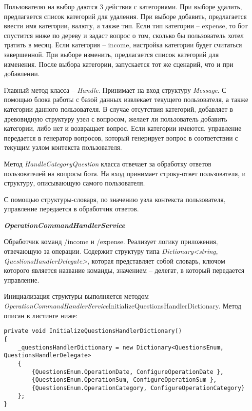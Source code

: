 Пользователю на выбор даются 3 действия с категориями. При выборе удалить, предлагается список категорий для удаления. При выборе добавить, предлагается ввести имя категории, валюту, а также тип. Если тип категории – expense, то бот спустится ниже по дереву и задаст вопрос о том, сколько бы пользователь хотел тратить в месяц. Если категория – income, настройка категории будет считаться завершенной. При выборе изменить, предлагается список категорий для изменения. После выбора категории, запускается тот же сценарий, что и при добавлении.

Главный метод класса – \emph{Handle}. Принимает на вход структуру \emph{Message}. С помощью блока работы с базой данных извлекает текущего пользователя, а также категории данного пользователя. В случае отсутствия категорий, добавляет в древовидную структуру узел с вопросом, желает ли пользователь добавить категории, либо нет и возвращает вопрос. Если категории имеются, управление передается в генератор вопросов, который генерирует вопрос в соответствии с текущим узлом контекста пользователя.

Метод \emph{HandleCategoryQuestion} класса отвечает за обработку ответов
пользователей на вопросы бота. На вход принимает строку-ответ
пользователя, и структуру, описывающую самого пользователя.

С помощью структуры-словаря, по значению узла контекста
пользователя, управление передается в обработчик ответов.

\textbf{\emph{OperationCommandHandlerService}}

Обработчик команд /income и /expense. Реализует логику приложения,
отвечающую за операции. Содержит структуру типа \emph{Dictionary<string,
QuestionsHandlerDelegate>}, которая представляет собой словарь, ключом
которого является название команды, значением – делегат, в который
передается управление.

Инициализация структуры выполняется методом \linebreak
\emph{OperationCommandHandlerService}InitializeQuestionsHandlerDictionary. Метод описан в листинге ниже:

\lstset{style=sharpc}
\begin{lstlisting}
private void InitializeQuestionsHandlerDictionary()
{
	_questionsHandlerDictionary = new Dictionary<QuestionsEnum, QuestionsHandlerDelegate>
	{
		{QuestionsEnum.OperationDate, ConfigureOperationDate },
		{QuestionsEnum.OperationSum, ConfigureOperationSum },
		{QuestionsEnum.OperationCategory, ConfigureOperationCategory}
	};
}
\end{lstlisting}

